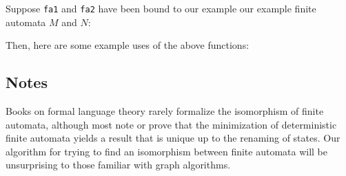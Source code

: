 Suppose \texttt{fa1} and \texttt{fa2} have been bound to our example
our example finite automata $M$ and $N$:
\begin{center}

\end{center}
Then, here are some example uses of the above functions:

%
%

\subsection{Notes}

Books on formal language theory rarely formalize the isomorphism
of finite automata, although most note or prove that the minimization of
deterministic finite automata yields a result that is unique up
to the renaming of states.  Our algorithm for trying to find an
isomorphism between finite automata will be unsurprising to those
familiar with graph algorithms.

